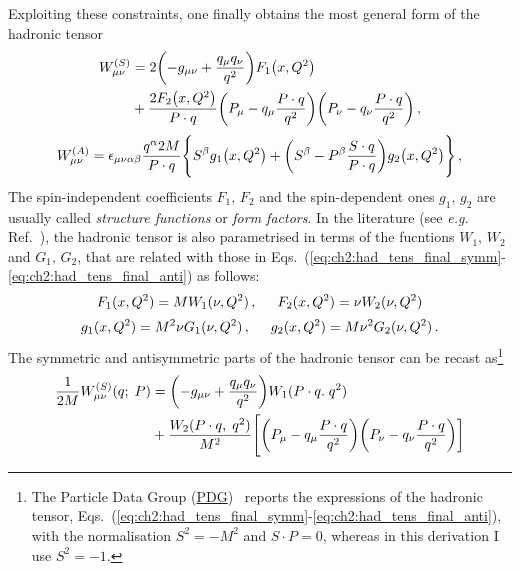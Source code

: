 Exploiting these constraints, one finally obtains the most general form of the hadronic tensor \cite{collins_2011}
\begin{equation}
  \begin{split}
  W_{\mu \nu}^{(S)} & = 2\qty(-g_{\mu \nu} + \frac{q_{\mu} q_{\nu}}{q^2}) F_1 \qty(x, Q^2) \\
  & + \frac{2 F_2 \qty(x , Q^2) }{P \cdot q} \qty(P_{\mu} - q_{\mu} \frac{P \cdot q}{q^2}) \qty(P_{\nu} - q_{\nu} \frac{P \cdot q}{q^2})\,,
  \label{eq:ch2:had_tens_final_symm}
  \end{split}
\end{equation}
\begin{equation}
  \begin{split}
    W_{\mu \nu}^{(A)}  =  \epsilon_{\mu \nu \alpha \beta} \frac{q^{\alpha}2 M}{P \cdot q} \Biggl\{S^{\beta} g_1 \qty(x, Q^2) + \qty(S^{\beta} - P^{\beta} \frac{S \cdot q}{P \cdot q}) g_2 \qty(x,Q^2) \Biggr\} \,,
    \label{eq:ch2:had_tens_final_anti}
  \end{split}
\end{equation}
The spin-independent coefficients $F_1,\, F_2$ and the spin-dependent ones $g_1,\,g_2$ are usually called \textit{structure functions} or \textit{form factors}. In the literature (see \textit{e.g.} Ref.~\cite{leader_2001,Anselmino:1994gn}), the hadronic tensor is also parametrised in terms of the fucntions $W_1 ,\, W_2$ and $G_1,\, G_2$, that are related with those in Eqs.~(\ref{eq:ch2:had_tens_final_symm}-\ref{eq:ch2:had_tens_final_anti}) as follows:
\begin{equation}
  F_1 (x, Q^2) = M W_1 (\nu, Q^2)\,, \hspace{5mm} F_2(x,Q^2) = \nu W_2 (\nu,Q^2)
\end{equation}
\begin{equation}
  g_1 (x, Q^2) = M^2 \nu G_1 (\nu, Q^2) \,, \hspace{5mm} g_2 (x, Q^2) = M \nu^2 G_2 (\nu, Q^2)\,.
\end{equation}
The symmetric and antisymmetric parts of the hadronic tensor can be recast as\footnote{\footnotesize The Particle Data Group (\href{https://pdg.lbl.gov/2019/reviews/rpp2019-rev-structure-functions.pdf}{PDG})~\cite{10.1093/ptep/ptaa104} reports the expressions of the hadronic tensor, Eqs.~(\ref{eq:ch2:had_tens_final_symm}-\ref{eq:ch2:had_tens_final_anti}), with the normalisation $S^2 = - M^2$ and $S \cdot P = 0$, whereas in this derivation I use $S^2 = - 1$.}
\begin{equation}
  \begin{split}
    \frac{1}{2M} W_{\mu \nu}^{(S)} (q; \; P) & = \qty(-g_{\mu \nu} + \frac{q_{\mu} q_{\nu}}{q^2}) W_1( P \cdot q. \; q^2) \\
    & + \frac{W_2 (P\cdot q,\; q^2)}{M^2} \Biggl[ \qty(P_{\mu} - q_{\mu} \frac{P \cdot q}{q^2}) \qty(P_{\nu} - q_{\nu} \frac{P \cdot q}{q^2}) \biggr]
  \end{split}
  \label{eq:ch2:had_tens_symm}
\end{equation}
